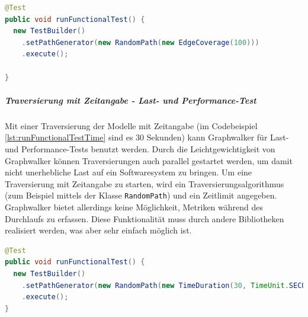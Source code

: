 \begin{lstlisting}[language=Java,caption={Eine randomisierte aber vollständige Traversierung des Modells in Graphwalker.}, label=lst:runFunctionalTest]
@Test
public void runFunctionalTest() {
  new TestBuilder()
    .setPathGenerator(new RandomPath(new EdgeCoverage(100)))
    .execute();
    
}
\end{lstlisting}


\subparagraph{Traversierung mit Zeitangabe - Last- und Performance-Test}
Mit einer Traversierung der Modelle mit Zeitangabe (im Codebeispiel \ref{lst:runFunctionalTestTime} sind es 30 Sekunden) kann Graphwalker für Last- und Performance-Tests benutzt werden. Durch die Leichtgewichtigkeit von Graphwalker können Traversierungen auch parallel gestartet werden, um damit nicht unerhebliche Last auf ein Softwaresystem zu bringen. Um eine Traversierung mit Zeitangabe zu starten, wird ein Traversierungsalgorithmus (zum Beispiel mittels der Klasse \texttt{RandomPath}) und ein Zeitlimit angegeben.\\
Graphwalker bietet allerdings keine Möglichkeit, Metriken während des Durchlaufs zu erfassen. Diese Funktionalität muss durch andere Bibliotheken realisiert werden, was aber sehr einfach möglich ist.

\begin{lstlisting}[language=Java,caption={Ein Graphwalker-Test, der das Modell 30 Sekunden lang zufällig traversiert, wird angestoßen.}, label=lst:runFunctionalTestTime]
@Test
public void runFunctionalTest() {  
  new TestBuilder()
    .setPathGenerator(new RandomPath(new TimeDuration(30, TimeUnit.SECONDS)))
    .execute();
}
\end{lstlisting}


